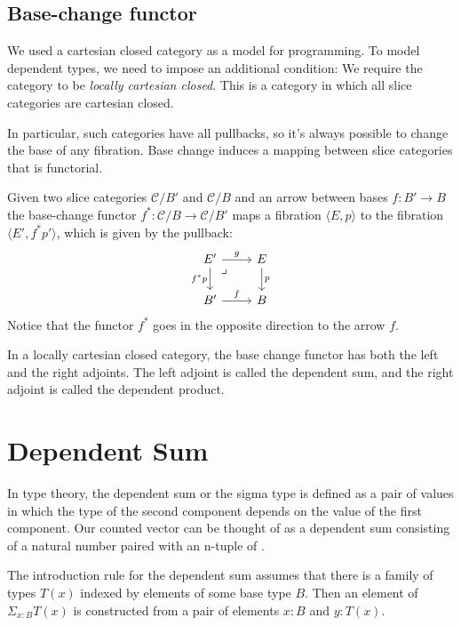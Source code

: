 \documentclass[DaoFP]{subfiles}
\begin{document}
\subsection{Base-change functor}

We used a cartesian closed category as a model for programming. To model dependent types, we need to impose an additional condition: We require the category to be \emph{locally cartesian closed}. This is a category in which all slice categories are cartesian closed. 

In particular, such categories have all pullbacks, so it's always possible to change the base of any fibration.  Base change induces a mapping between slice categories that is functorial. 

Given two slice categories $\mathcal{C}/B'$ and $\mathcal{C}/B$ and an arrow between bases $f \colon B' \to B$ the base-change functor $f^* \colon \mathcal{C}/B \to \mathcal{C}/B'$ maps a fibration $\langle E, p \rangle$ to the fibration $\langle E', f^* p' \rangle$, which is given by the pullback:
\[
 \begin{tikzcd}
 E'
\arrow[dr, phantom,  , very near start, "\lrcorner"]
 \arrow[d, "f^*p"']
 \arrow[r, "g"]
 & E
 \arrow[d, "p"]
 \\
 B'
 \arrow[r, "f"]
 &B
  \end{tikzcd}
\]
Notice that the functor $f^*$ goes in the opposite direction to the arrow $f$.

In a locally cartesian closed category, the base change functor has both the left and the right adjoints. The left adjoint is called the dependent sum, and the right adjoint is called the dependent product.


\section{Dependent Sum}

In type theory, the dependent sum or the sigma type is defined as a pair of values in which the type of the second component depends on the value of the first component. Our counted vector can be thought of as a dependent sum consisting of a natural number  paired with an n-tuple of .

The introduction rule for the dependent sum assumes that there is a family of types $T(x)$ indexed by elements of some base type $B$. Then an element of $\Sigma_{x : B} T(x)$ is constructed from a pair of elements $x \colon B$ and $y \colon T(x)$. 
\end{document}
